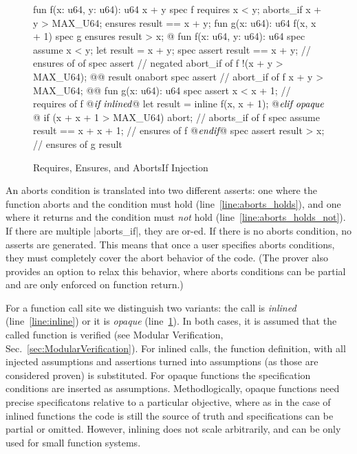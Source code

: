 \begin{figure}[t!]
  \caption{Requires, Ensures, and AbortsIf Injection}
  \label{fig:RequiresEnsuresAbortsIf}
  \centering
\begin{MoveBox}
  fun f(x: u64, y: u64): u64 { x + y }
  spec f {
    requires x < y;
    aborts_if x + y > MAX_U64;
    ensures result == x + y;
  }
  fun g(x: u64): u64 { f(x, x + 1) }
  spec g {
    ensures result > x;
  }
  @\transform@
  fun f(x: u64, y: u64): u64 {
    spec assume x < y;
    let result = x + y;
    spec assert result == x + y;     // ensures of of
    spec assert                      // negated abort_if of f
      !(x + y > MAX_U64); @\label{line:aborts_holds_not}@
    result
  } onabort {
    spec assert                      // abort_if of f
      x + y > MAX_U64; @\label{line:aborts_holds}@
  }
  fun g(x: u64): u64 {
    spec assert x < x + 1;           // requires of f
@$\textrm{\it if inlined}$\label{line:inline}@
    let result = inline f(x, x + 1);
@$\textrm{\it elif opaque}$\label{line:opaque}@
    if (x + x + 1 > MAX_U64) abort;  // aborts_if of f
    spec assume result == x + x + 1; // ensures of f
@$\textrm{\it endif}$@
    spec assert result > x;          // ensures of g
    result
  }
\end{MoveBox}
\end{figure}

An aborts condition is translated into two different asserts: one where the
function aborts and the condition must hold (line~\ref{line:aborts_holds}), and
one where it returns and the condition must \emph{not} hold
(line~\ref{line:aborts_holds_not}). If there are multiple |aborts_if|, they are
or-ed. If there is no aborts condition, no asserts are generated. This means
that once a user specifies aborts conditions, they must completely cover the
abort behavior of the code. (The prover also provides an option to relax this
behavior, where aborts conditions can be partial and are only enforced on
function return.)

For a function call site we distinguish two variants: the call is \emph{inlined}
(line~\ref{line:inline}) or it is \emph{opaque} (line~\ref{line:opaque}). In
both cases, it is assumed that the called function is verified (see Modular
Verification, Sec.~\ref{sec:ModularVerification}). For inlined calls, the
function definition, with all injected assumptions and assertions turned into
assumptions (as those are considered proven) is substituted. For opaque
functions the specification conditions are inserted as
assumptions. Methodlogically, opaque functions need precise specificatons
relative to a particular objective, where as in the case of inlined functions
the code is still the source of truth and specifications can be partial or
omitted. However, inlining does not scale arbitrarily, and can be only used for
small function systems.

